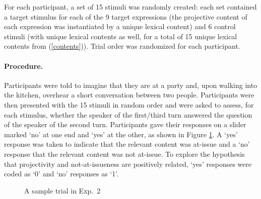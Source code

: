 \documentclass[11pt,fleqn]{article}
\newcommand{\6}{\mbox{$[\hspace*{-.6mm}[$}}
\newcommand{\9}{\mbox{$]\hspace*{-.6mm}]$}}
\begin{document}
For each participant, a set of 15 stimuli was randomly created: each set contained a target stimulus for each of the 9 target expressions (the projective content of each expression was instantiated by a unique lexical content) and 6 control stimuli (with unique lexical contents as well, for a total of 15 unique lexical contents from (\ref{contents})). Trial order was randomized for each participant.


\paragraph{Procedure.} Participants were told to imagine that they are at a party and, upon walking into the kitchen, overhear a short conversation between two people. Participants were then presented with the 15 stimuli in random order and were asked to assess, for each stimulus, whether the speaker of the first/third turn answered the question of the speaker of the second turn. Participants gave their responses on a slider marked `no' at one end and `yes' at the other, as shown in Figure \ref{f-trial-exp2a}. A `yes' response was taken to indicate that the relevant content was at-issue and a `no' response that the relevant content was not at-issue. To explore the hypothesis that projectivity and not-at-issueness are positively related, `yes' responses were coded as `0' and `no' responses as `1'. 

\begin{figure}[!h]
\begin{center}
\end{center}
\caption{A sample trial in Exp.~2}
\label{f-trial-exp2a}
\end{figure}
\end{document}
